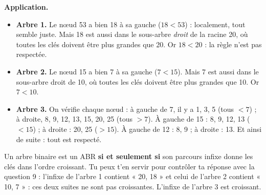 \documentclass[11pt, a4paper]{exam}
\newcommand{\application}{\par\noindent\textbf{Application.}\ }
\begin{document}
\begin{center}
\hspace{1cm}
\end{center}

\application
\begin{itemize}
\item \textbf{Arbre 1.} Le nœud 53 a bien 18 à sa gauche ($18 < 53$) : localement, tout semble juste. Mais 18 est aussi dans le sous-arbre \emph{droit} de la racine 20, où toutes les clés doivent être plus grandes que 20. Or $18 < 20$ : la règle n'est pas respectée.
\item \textbf{Arbre 2.} Le nœud 15 a bien 7 à sa gauche ($7 < 15$). Mais 7 est aussi dans le sous-arbre droit de 10, où toutes les clés doivent être plus grandes que 10. Or $7 < 10$.
\item \textbf{Arbre 3.} On vérifie chaque nœud : à gauche de 7, il y a 1, 3, 5 (tous $< 7$) ; à droite, 8, 9, 12, 13, 15, 20, 25 (tous $> 7$). À gauche de 15 : 8, 9, 12, 13 ($< 15$) ; à droite : 20, 25 ($> 15$). À gauche de 12 : 8, 9 ; à droite : 13. Et ainsi de suite : tout est respecté.
\end{itemize}

\begin{retenir}
Un arbre binaire est un ABR \textbf{si et seulement si} son parcours infixe donne les clés dans l'ordre croissant. Tu peux t'en servir pour contrôler ta réponse avec la question 9 :
l'infixe de l'arbre 1 contient « 20, 18 » et celui de l'arbre 2 contient « 10, 7 » : ces deux suites ne sont pas croissantes. L'infixe de l'arbre 3 est croissant.
\end{retenir}
\end{document}
